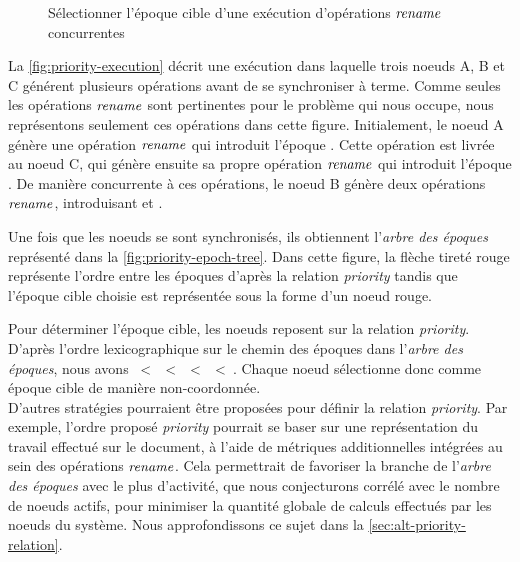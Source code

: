 \begin{figure}[!ht]
{\begin{minipage}{\linewidth}
          \label{fig:priority-epoch-tree}
      \end{minipage}}
  \caption{Sélectionner l'époque cible d'une exécution d'opérations $\mathit{rename}$ concurrentes}
  \label{fig:priority-example}
\end{figure}

La \autoref{fig:priority-execution} décrit une exécution dans laquelle trois noeuds A, B et C générent plusieurs opérations avant de se synchroniser à terme.
Comme seules les opérations $\mathit{rename}$ sont pertinentes pour le problème qui nous occupe, nous représentons seulement ces opérations dans cette figure.
Initialement, le noeud A génère une opération $\mathit{rename}$ qui introduit l'époque .
Cette opération est livrée au noeud C, qui génère ensuite sa propre opération $\mathit{rename}$ qui introduit l'époque .
De manière concurrente à ces opérations, le noeud B génère deux opérations $\mathit{rename}$, introduisant  et .

Une fois que les noeuds se sont synchronisés, ils obtiennent l'\emph{arbre des époques} représenté dans la \autoref{fig:priority-epoch-tree}.
Dans cette figure, la flèche tireté rouge représente l'ordre entre les époques d'après la relation \emph{priority} tandis que l'époque cible choisie est représentée sous la forme d'un noeud rouge.

Pour déterminer l'époque cible, les noeuds reposent sur la relation \emph{priority}.
D'après l'ordre lexicographique sur le chemin des époques dans l'\emph{arbre des époques}, nous avons ~<~~<~~<~~<~.
Chaque noeud sélectionne donc  comme époque cible de manière non-coordonnée.\\

D'autres stratégies pourraient être proposées pour définir la relation \emph{priority}.
Par exemple, l'ordre proposé \emph{priority} pourrait se baser sur une représentation du travail effectué sur le document, à l'aide de métriques additionnelles intégrées au sein des opérations $\mathit{rename}$.
Cela permettrait de favoriser la branche de l'\emph{arbre des époques} avec le plus d'activité, que nous conjecturons corrélé avec le nombre de noeuds actifs, pour minimiser la quantité globale de calculs effectués par les noeuds du système.
Nous approfondissons ce sujet dans la \autoref{sec:alt-priority-relation}.
